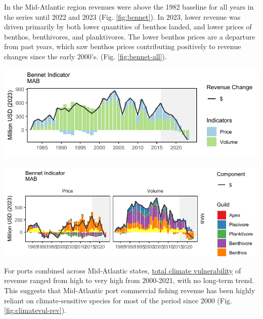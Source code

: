 \documentclass[
  10pt,
]{article}
\let\origfigure\figure
\let\endorigfigure\endfigure
\renewenvironment{figure}[1][2] {
    \expandafter\origfigure\expandafter[H]
} {
    \endorigfigure
}
\begin{document}
In the Mid-Atlantic region revenues were above the 1982 baseline for all years in the series until 2022 and 2023 (Fig. \ref{fig:bennet}). In 2023, lower revenue was driven primarily by both lower quantities of benthos landed, and lower prices of benthos, benthivores, and planktivores. The lower benthos prices are a departure from past years, which saw benthos prices contributing positively to revenue changes since the early 2000's. (Fig. \ref{fig:bennet-all}).

\begin{figure}

{\centering \includegraphics{midatlantic_files/figure-latex/bennet-1} 

}

\caption{Revenue change from 1982 values in 2023 dollars (black); Price (PI), and Volume Indicators (VI) for total commercial landings in the Mid-Atlantic Bight.}\label{fig:bennet}
\end{figure}

\begin{figure}

{\centering \includegraphics{midatlantic_files/figure-latex/bennet-all-1} 

}

\caption{Total price and volume indicators in 2023 dollars (black) for commercial landings, and individual guild contributions to each indicator, in the Mid-Atlantic Bight.}\label{fig:bennet-all}
\end{figure}

For ports combined across Mid-Atlantic states, \href{https://noaa-edab.github.io/catalog/community_climate_vulnerability.html}{total climate vulnerability} of revenue ranged from high to very high from 2000-2021, with no long-term trend. This suggests that Mid-Atlantic port commercial fishing revenue has been highly reliant on climate-sensitive species for most of the period since 2000 (Fig. \ref{fig:climatevul-rev}).
\end{document}
